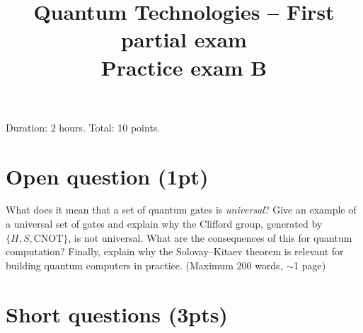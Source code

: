 \documentclass[11pt,a4paper]{article}
\title{Quantum Technologies -- First partial exam\\[4pt] \large Practice exam B}
\date{}
\begin{document}
\maketitle
\vspace{-1.5cm}
\begin{center}
Duration: 2 hours. Total: 10 points.
\end{center}

\section{Open question (1pt)}

What does it mean that a set of quantum gates is \emph{universal}? Give an example of a universal
set of gates and explain why the Clifford group, generated by $\{H,S,\text{CNOT}\}$, is not universal.
What are the consequences of this for quantum computation? Finally, explain why the
Solovay--Kitaev theorem is relevant for building quantum computers in practice.
(Maximum 200 words, $\sim$1 page)

\section{Short questions (3pts)}
\end{document}

